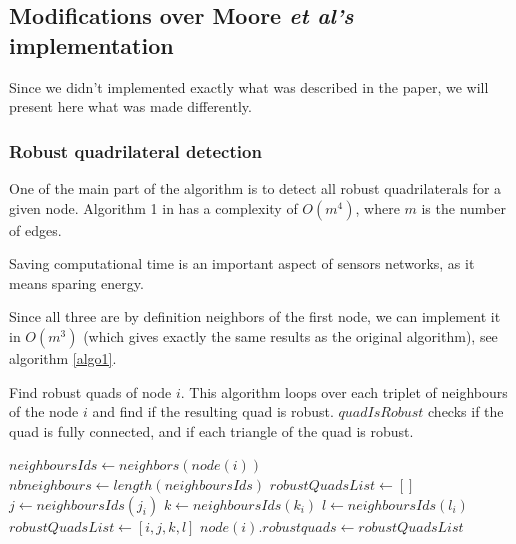 \documentclass[letterpaper, 10 pt, conference]{ieeeconf}  %
\begin{document}



\subsection{Modifications over Moore \emph{et al's} implementation}

Since we didn't implemented exactly what was described in the paper, we will present here what was made differently.

\subsubsection{Robust quadrilateral detection}

One of the main part of the algorithm is to detect all robust quadrilaterals for a given node. Algorithm 1 in \cite{MooreTeller} has a complexity of $O(m^4)$, where $m$ is the number of edges. 

Saving computational time is an important aspect of sensors networks, as it means sparing energy.

Since all three are by definition neighbors of the first node, we can implement it in $O(m^3)$ (which gives exactly the same results as the original algorithm), see algorithm \ref{algo1}.

\begin{algorithm}
\caption{\label{algo1}Find robust quads of node $i$. This algorithm loops over each triplet of neighbours of the node $i$ and find if the resulting quad is robust. $quadIsRobust$ checks if the quad is fully connected, and if each triangle of the quad is robust.}
\begin{algorithmic} 
\STATE $neighboursIds \leftarrow neighbors(node(i))$
\STATE $nbneighbours \leftarrow length(neighboursIds)$ 
\STATE $robustQuadsList \leftarrow []$ 
\STATE $j \leftarrow neighboursIds(j_i)$ 
\STATE $k \leftarrow neighboursIds(k_i)$
\STATE $l \leftarrow neighboursIds(l_i)$ \newline
{} 
\STATE $robustQuadsList \leftarrow [i, j, k, l]$
\ENDIF 
\newline
\ENDFOR
\ENDFOR
\ENDFOR 
\STATE $node(i).robustquads \leftarrow robustQuadsList$
\end{algorithmic}
\end{algorithm}
\end{document}
